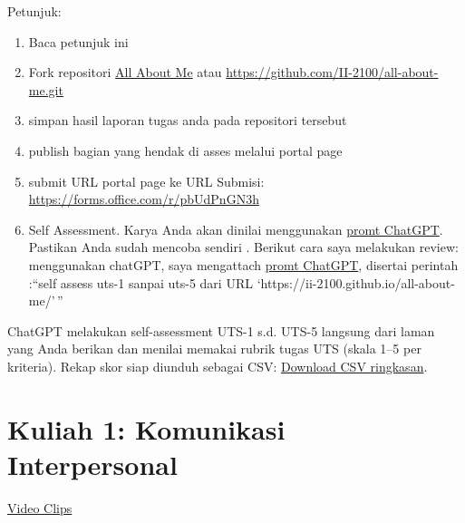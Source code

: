 \documentclass[
  letterpaper,
  DIV=11,
  numbers=noendperiod]{scrreprt}
\begin{document}
\begin{tcolorbox}[enhanced jigsaw, opacityback=0, bottomrule=.15mm, arc=.35mm, toptitle=1mm, title=\textcolor{quarto-callout-important-color}{\faExclamation}\hspace{0.5em}{Important}, colframe=quarto-callout-important-color-frame, breakable, colbacktitle=quarto-callout-important-color!10!white, bottomtitle=1mm, opacitybacktitle=0.6, colback=white, coltitle=black, titlerule=0mm, toprule=.15mm, rightrule=.15mm, leftrule=.75mm, left=2mm]

Petunjuk:

\begin{enumerate}
\def\labelenumi{\arabic{enumi}.}
\item
  Baca petunjuk ini
\item
  Fork repositori \href{https://github.com/II-2100/all-about-me.git}{All
  About Me} atau \url{https://github.com/II-2100/all-about-me.git}
\item
  simpan hasil laporan tugas anda pada repositori tersebut
\item
  publish bagian yang hendak di asses melalui portal page
\item
  submit URL portal page ke URL Submisi:
  \url{https://forms.office.com/r/pbUdPnGN3h}
\item
  Self Assessment. Karya Anda akan dinilai menggunakan
  \href{asesmen/skor_uts.pdf}{promt ChatGPT}. Pastikan Anda sudah
  mencoba sendiri . Berikut cara saya melakukan review: menggunakan
  chatGPT, saya mengattach \href{asesmen/skor_uts.pdf}{promt ChatGPT},
  disertai perintah :``self assess uts-1 sanpai uts-5 dari URL
  `https://ii-2100.github.io/all-about-me/'\,''
\end{enumerate}

ChatGPT melakukan self-assessment UTS-1 s.d. UTS-5 langsung dari laman
yang Anda berikan dan menilai memakai rubrik tugas UTS (skala 1--5 per
kriteria). Rekap skor siap diunduh sebagai CSV:
\href{sandbox:/mnt/data/UTS_self_assessment.csv}{Download CSV
ringkasan}.

\end{tcolorbox}


\chapter{Kuliah 1: Komunikasi
Interpersonal}\label{kuliah-1-komunikasi-interpersonal}

\href{https://youtube.com/playlist?list=PL_m-BplfO92EHtF458s1yWRf6u0lGZQaZ&si=hAc9s5o7a4aHXJFO}{Video
Clips}
\end{document}
